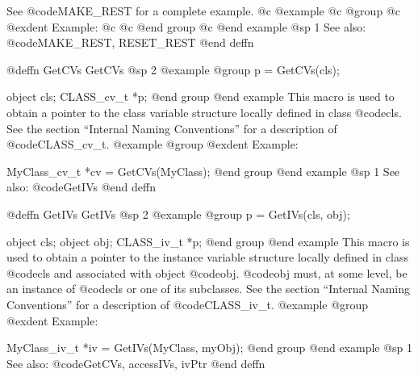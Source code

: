 {{{{See @code{MAKE_REST} for a complete example.
@c @example
@c @group
@c @exdent Example:
@c 
@c @end group
@c @end example
@sp 1
See also:  @code{MAKE_REST, RESET_REST}
@end deffn















@deffn {GetCVs} GetCVs
@sp 2
@example
@group
p = GetCVs(cls);

object       cls;
CLASS_cv_t  *p;
@end group
@end example
This macro is used to obtain a pointer to the class variable structure
locally defined in class @code{cls}.  See the section ``Internal Naming
Conventions'' for a description of @code{CLASS_cv_t}.
@example
@group
@exdent Example:

MyClass_cv_t  *cv = GetCVs(MyClass);
@end group
@end example
@sp 1
See also:  @code{GetIVs}
@end deffn
























@deffn {GetIVs} GetIVs
@sp 2
@example
@group
p = GetIVs(cls, obj);

object       cls;
object       obj;
CLASS_iv_t  *p;
@end group
@end example
This macro is used to obtain a pointer to the instance variable
structure locally defined in class @code{cls} and associated with object
@code{obj}.  @code{obj} must, at some level, be an instance of
@code{cls} or one of its subclasses.  See the section ``Internal Naming
Conventions'' for a description of @code{CLASS_iv_t}.
@example
@group
@exdent Example:

MyClass_iv_t  *iv = GetIVs(MyClass, myObj);
@end group
@end example
@sp 1
See also:  @code{GetCVs, accessIVs, ivPtr}
@end deffn




















}}}}
